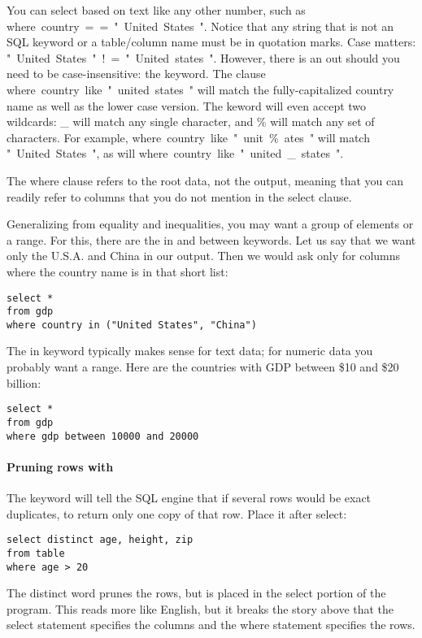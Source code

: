 You can select based on text like any other number, such as \si{where
country == "United States"}. Notice that any string that is not an SQL
keyword or a table/column name must be in quotation marks. Case matters:
\si{"United States" != "United states"}. However, there is an out should
you need to be case-insensitive: the  keyword. The clause \si{where 
country like "united states"} will match the fully-capitalized country
name as well as the lower case version. The
 keword will even accept two wildcards: 
\si{\_} will match any single character, and \si{\%} will match any
set of characters. For example, \si{where country like "unit\%ates"}
will match \si{"United States"}, as will \si{where country like "united\_states"}.

The \si{where} clause refers to the root data, not the output,
meaning that you can readily refer to columns that you do not mention
in the \si{select} clause.


 
Generalizing from equality and inequalities, you may want a group of
elements or a range. For this, there are the \si{in} and \si{between}
keywords. Let us say that we want only the U.S.A. and China in our
output. Then we would ask only for columns where the country name is in
that short list: 
\begin{lstlisting}
select * 
from gdp
where country in ("United States", "China")
\end{lstlisting}

The \si{in} keyword typically makes sense for text data; for numeric
data you probably want a range. Here are the countries with GDP between
\$10 and \$20 billion:

\begin{lstlisting}
select * 
from gdp
where gdp between 10000 and 20000
\end{lstlisting}



\paragraph{Pruning rows with } The 
keyword will tell the SQL engine that if several rows would be exact
duplicates, to return only one copy of that row. Place it after 
\si{select}: 
\begin{lstlisting}
select distinct age, height, zip
from table
where age > 20
\end{lstlisting}
The  \si{distinct} word prunes the rows, but is placed in the 
\si{select} portion of the program.  This reads more like English, but it
breaks the story above that the \si{select} statement specifies the
columns and the \si{where} statement specifies the rows.

